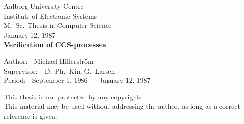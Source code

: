 \begin{titlepage}
\begin{center}
\large Aalborg University Centre\\
Institute of Electronic Systems\\
M.~Sc.~Thesis in Computer Science\\
\normalsize January 12, 1987\\[3.5cm]

{\bf\huge Verification of CCS-processes}\\[6.2cm]

\begin{flushleft}
Author:\ \ Michael Hillerstr\"om\\[1cm]
Supervisor:\ \ D.~Ph.~Kim G.~Larsen\\[1.4cm]
Period:\ \ September 1, 1986 --- January 12, 1987

\vfill
\scriptsize
This thesis is not protected by any copyrights.\\
This material may be used without addressing the author, as long as a correct reference is given.
\end{flushleft}
\end{center}
\end{titlepage}
